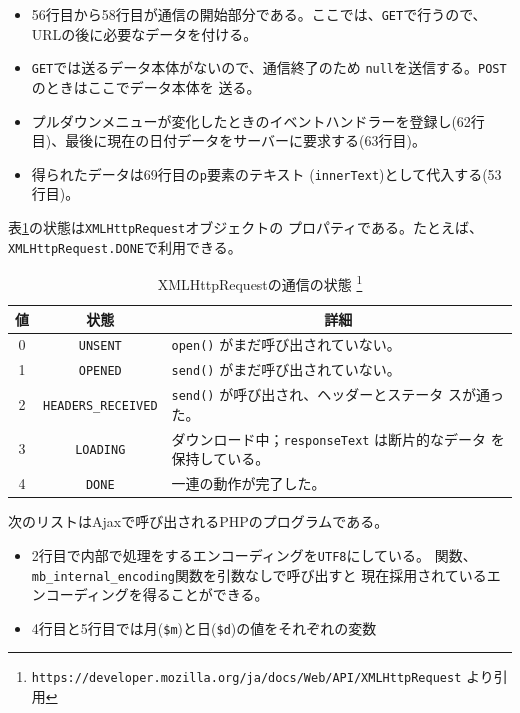 \begin{Exec}
\begin{itemize}
 \item 56行目から58行目が通信の開始部分である。ここでは、\texttt{GET}で行うので、
       URLの後に必要なデータを付ける。
 \item \texttt{GET}では送るデータ本体がないので、通信終了のため
       \texttt{null}を送信する。\texttt{POST}のときはここでデータ本体を
       送る。
 \item プルダウンメニューが変化したときのイベントハンドラーを登録し(62行
       目)、最後に現在の日付データをサーバーに要求する(63行目)。
 \item 得られたデータは69行目の\texttt{p}要素のテキスト
       (\texttt{innerText})として代入する(53行目)。
\end{itemize}
 表\ref{XMLHttpRequestRes}の状態は\texttt{XMLHttpRequest}オブジェクトの
 プロパティである。たとえば、\texttt{XMLHttpRequest.DONE}で利用できる。
 \begin{table}[ht]
	\caption{XMLHttpRequestの通信の状態
\protect\footnote{\protect\texttt{https://developer.mozilla.org/ja/docs/Web/API/XMLHttpRequest}
	より引用}} \label{XMLHttpRequestRes}
		\begin{tabular}{|c|c|m{}|}\hline
		 値&状態&\multicolumn{1}{c|}{詳細}\\\hline
		 0&\Verb+UNSENT+&\Verb+open()+ がまだ呼び出されていない。\\\hline
1&\Verb+OPENED+&\Verb+send()+ がまだ呼び出されていない。\\\hline
2&\Verb+HEADERS_RECEIVED+&\Verb+send()+ が呼び出され、ヘッダーとステータ
						 スが通った。\\\hline 
3&\Verb+LOADING+&ダウンロード中；\Verb+responseText+ は断片的なデータ
						 を保持している。\\\hline 
4&\Verb+DONE+&一連の動作が完了した。\\\hline
		\end{tabular}
 \end{table}

 次のリストはAjaxで呼び出されるPHPのプログラムである。
\begin{itemize}
 \item 2行目で内部で処理をするエンコーディングを\texttt{UTF8}にしている。
       関数、\texttt{mb\_internal\_encoding}関数を引数なしで呼び出すと
       現在採用されているエンコーディングを得ることができる。
 \item 4行目と5行目では月(\Verb+$m+)と日(\Verb+$d+)の値をそれぞれの変数

\end{itemize}
\end{Exec}
